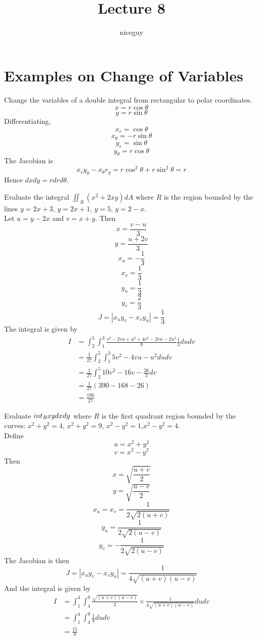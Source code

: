 \documentclass[12pt]{article}
\author{niceguy}
\title{Lecture 8}
\begin{document}
\maketitle

\section{Examples on Change of Variables}

\begin{ex}
	Change the variables of a double integral from rectangular to polar coordinates.
	$$x = r\cos\theta$$
	$$y = r\sin\theta$$
	Differentiating,
	$$x_r = \cos\theta$$
	$$x_\theta = -r\sin\theta$$
	$$y_r = \sin\theta$$
	$$y_\theta = r\cos\theta$$
	The Jacobian is
	$$x_ry_\theta - x_\theta r_y = r\cos^2\theta+r\sin^2\theta = r$$
	Hence $dxdy = rdrd\theta$.
\end{ex}

\begin{ex}
	Evaluate the integral $\iint_R(x^2+2xy)dA$ where $R$ is the region bounded by the lines $y=2x+3$, $y=2x+1$, $y=5$, $y=2-x$. \\
	Let $u=y-2x$ and $v = x+y$. Then
	$$x = \frac{v-u}{3}$$
	$$y = \frac{u+2v}{3}$$
	$$x_u = -\frac{1}{3}$$
	$$x_v = \frac{1}{3}$$
	$$y_u = \frac{1}{3}$$
	$$y_v = \frac{2}{3}$$
	$$J = |x_uy_v - x_vy_u| = \frac{1}{3}$$
	The integral is given by
	\begin{align*}
	I &= \int_2^5 \int_1^3 \frac{v^2-2vu+u^2+4v^2-2vu-2u^2}{9} \frac{1}{3}dudv \\
		  &= \frac{1}{27} \int_2^5 \int_1^3 5v^2 - 4vu - u^2 dudv \\
		  &= \frac{1}{27} \int_2^5 10v^2 - 16v - \frac{26}{3} dv \\
		  &= \frac{1}{27} (390 - 168 - 26) \\
		  &= \frac{196}{27}
	\end{align*}
\end{ex}

\begin{ex}
	Evaluate $\\int_Rxydxdy$ where $R$ is the first quadrant region bounded by the curves: $x^2+y^2=4$, $x^2+y^2=9$, $x^2-y^2=1$,$x^2-y^2=4$. \\
	Define
	$$u = x^2+y^2$$
	$$v = x^2-y^2$$
	Then
	$$x = \sqrt{\frac{u+v}{2}}$$
	$$y = \sqrt{\frac{u-v}{2}}$$
	$$x_u = x_v = \frac{1}{2\sqrt{2(u+v)}}$$
	$$y_u = \frac{1}{2\sqrt{2(u-v)}}$$
	$$y_v = -\frac{1}{2\sqrt{2(u-v)}}$$
	The Jacobian is then
	$$J = |x_uy_v - x_vy_u| = \frac{1}{4\sqrt{(u+v)(u-v)}}$$
	And the integral is given by
	\begin{align*}
		I &= \int_1^4\int_4^9 \frac{\sqrt{(u+v)(u-v)}}{2} \times \frac{1}{4\sqrt{(u+v)(u-v)}} dudv \\
		  &= \int_1^4\int_4^9 \frac{1}{8} dudv \\
		  &= \frac{15}{8}
	\end{align*}
\end{ex}
\end{document}
